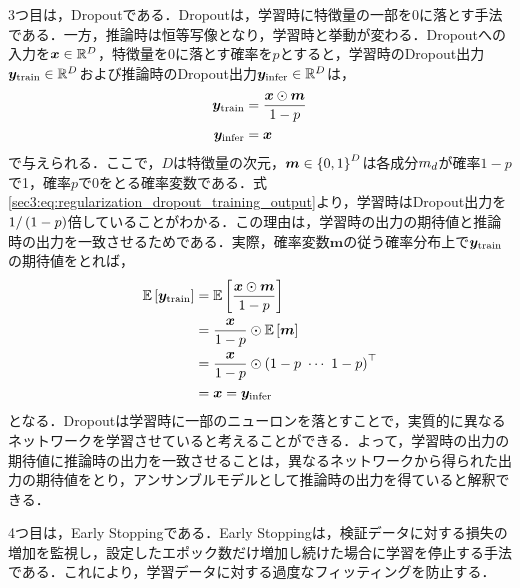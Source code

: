 3つ目は，Dropout\cite{srivastava2014dropout}である．Dropoutは，学習時に特徴量の一部を0に落とす手法である．一方，推論時は恒等写像となり，学習時と挙動が変わる．Dropoutへの入力を$\bm{x} \in \mathbb{R}^{D}$，特徴量を0に落とす確率を$p$とすると，学習時のDropout出力$\bm{y}_{\text{train}} \in \mathbb{R}^{D}$および推論時のDropout出力$\bm{y}_{\text{infer}} \in \mathbb{R}^{D}$は，
\begin{align}
    \bm{y}_{\text{train}} & = \frac{\bm{x} \odot \bm{m}}{1 - p} \label{sec3:eq:regularization_dropout_training_output} \\
    \bm{y}_{\text{infer}} & = \bm{x}
\end{align}
で与えられる．ここで，$D$は特徴量の次元，$\bm{m} \in \left\{0, 1\right\}^{D}$は各成分$m_{d}$が確率$1 - p$で1，確率$p$で0をとる確率変数である．式\eqref{sec3:eq:regularization_dropout_training_output}より，学習時はDropout出力を$1 / \left(1 - p\right)$倍していることがわかる．この理由は，学習時の出力の期待値と推論時の出力を一致させるためである．実際，確率変数$\bm{m}$の従う確率分布上で$\bm{y}_{\text{train}}$の期待値をとれば，
\begin{align}
    \mathbb{E}\left[\bm{y}_{\text{train}}\right] & = \mathbb{E}\left[\frac{\bm{x} \odot \bm{m}}{1 - p}\right]             \\
                                                   & = \frac{\bm{x}}{1 - p} \odot \mathbb{E}\left[\bm{m}\right]             \\
                                                   & = \frac{\bm{x}}{1 - p} \odot \left(1 - p ~ \cdots ~ 1 - p\right)^\top \\
                                                   & = \bm{x} = \bm{y}_{\text{infer}}
\end{align}
となる．Dropoutは学習時に一部のニューロンを落とすことで，実質的に異なるネットワークを学習させていると考えることができる．よって，学習時の出力の期待値に推論時の出力を一致させることは，異なるネットワークから得られた出力の期待値をとり，アンサンブルモデルとして推論時の出力を得ていると解釈できる．

4つ目は，Early Stoppingである．Early Stoppingは，検証データに対する損失の増加を監視し，設定したエポック数だけ増加し続けた場合に学習を停止する手法である．これにより，学習データに対する過度なフィッティングを防止する．

